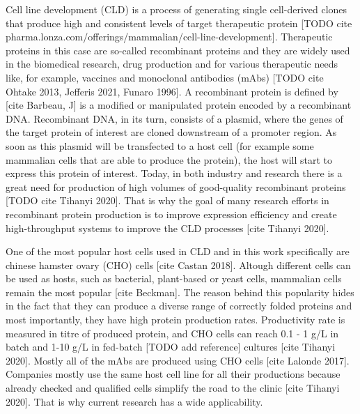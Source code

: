Cell line development (CLD) is a process of generating single cell-derived clones that produce high and consistent levels of target therapeutic protein [TODO cite pharma.lonza.com/offerings/mammalian/cell-line-development]. Therapeutic proteins in this case are so-called recombinant proteins and they are widely used in the biomedical research, drug production and for various therapeutic needs like, for example, vaccines and monoclonal antibodies (mAbs) [TODO cite Ohtake 2013, Jefferis 2021, Funaro 1996]. A recombinant protein is defined by [cite Barbeau, J] is a modified or manipulated protein encoded by a recombinant DNA. Recombinant DNA, in its turn, consists of a plasmid, where the genes of the target protein of interest are cloned downstream of a promoter region. As soon as this plasmid will be transfected to a host cell (for example some mammalian cells that are able to produce the protein), the host will start to express this protein of interest. Today, in both industry and research there is a great need for production of high volumes of good-quality recombinant proteins [TODO cite Tihanyi 2020]. That is why the goal of many research efforts in recombinant protein production is to improve expression efficiency and create high-throughput systems to improve the CLD processes [cite Tihanyi 2020].


One of the most popular host cells used in CLD and in this work specifically are chinese hamster ovary (CHO) cells [cite Castan 2018]. Altough different cells can be used as hosts, such as bacterial, plant-based or yeast cells, mammalian cells remain the most popular [cite Beckman]. The reason behind this popularity hides in the fact that they can produce a diverse range of correctly folded proteins and most importantly, they have high protein production rates. Productivity rate is measured in titre of produced protein, and CHO cells can reach 0.1 - 1 g/L in batch and 1-10 g/L in fed-batch [TODO add reference] cultures [cite Tihanyi 2020]. Mostly all of the mAbs are produced using CHO cells [cite Lalonde 2017]. Companies mostly use the same host cell line for all their productions because already checked and qualified cells simplify the road to the clinic [cite Tihanyi 2020]. That is why current research has a wide applicability.

